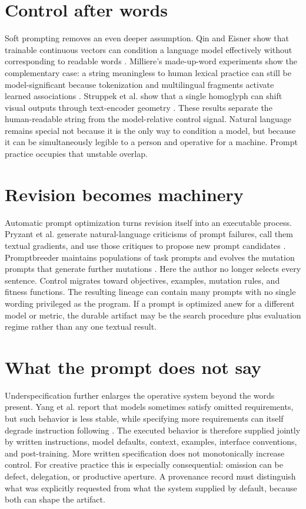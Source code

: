 \documentclass[11pt]{article}
\begin{document}
\section{Control after words}
Soft prompting removes an even deeper assumption. Qin and Eisner show that trainable continuous vectors can condition a language model effectively without corresponding to readable words \citep{QinEisner2021SoftPrompts}. Milliere's made-up-word experiments show the complementary case: a string meaningless to human lexical practice can still be model-significant because tokenization and multilingual fragments activate learned associations \citep{Milliere2022MadeUpWords}. Struppek et al. show that a single homoglyph can shift visual outputs through text-encoder geometry \citep{Struppek2023Homoglyphs}. These results separate the human-readable string from the model-relative control signal. Natural language remains special not because it is the only way to condition a model, but because it can be simultaneously legible to a person and operative for a machine. Prompt practice occupies that unstable overlap.
\section{Revision becomes machinery}
Automatic prompt optimization turns revision itself into an executable process. Pryzant et al. generate natural-language criticisms of prompt failures, call them textual gradients, and use those critiques to propose new prompt candidates \citep{Pryzant2023APO}. Promptbreeder maintains populations of task prompts and evolves the mutation prompts that generate further mutations \citep{Fernando2023Promptbreeder}. Here the author no longer selects every sentence. Control migrates toward objectives, examples, mutation rules, and fitness functions. The resulting lineage can contain many prompts with no single wording privileged as the program. If a prompt is optimized anew for a different model or metric, the durable artifact may be the search procedure plus evaluation regime rather than any one textual result.
\section{What the prompt does not say}
Underspecification further enlarges the operative system beyond the words present. Yang et al. report that models sometimes satisfy omitted requirements, but such behavior is less stable, while specifying more requirements can itself degrade instruction following \citep{Yang2025PromptsDontSay}. The executed behavior is therefore supplied jointly by written instructions, model defaults, context, examples, interface conventions, and post-training. More written specification does not monotonically increase control. For creative practice this is especially consequential: omission can be defect, delegation, or productive aperture. A provenance record must distinguish what was explicitly requested from what the system supplied by default, because both can shape the artifact.
\end{document}
